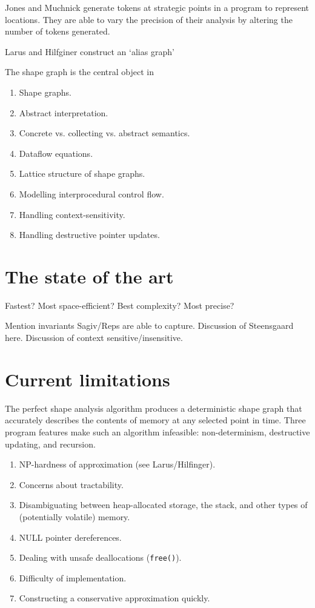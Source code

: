 \documentclass{article}
\begin{document}
    Jones and Muchnick generate tokens at strategic points in a program to
    represent locations. They are able to vary the precision of their
    analysis by altering the number of tokens generated. 

    Larus and Hilfginer construct an `alias graph'

The shape graph is the central object in 

\begin{enumerate}[1.]
    \item Shape graphs.
    \item Abstract interpretation.
    \item Concrete vs. collecting vs. abstract semantics.
    \item Dataflow equations.
    \item Lattice structure of shape graphs.
    \item Modelling interprocedural control flow.
    \item Handling context-sensitivity.
    \item Handling destructive pointer updates.
\end{enumerate}

\section{The state of the art}

Fastest?
Most space-efficient?
Best complexity?
Most precise?

Mention invariants Sagiv/Reps are able to capture.
Discussion of Steensgaard here.
Discussion of context sensitive/insensitive.

\section{Current limitations}

The perfect shape analysis algorithm produces a deterministic shape graph
that accurately describes the contents of memory at any selected point in
time. Three program features make such an algorithm infeasible:
non-determinism, destructive updating, and recursion. 

\begin{enumerate}[1.]
    \item NP-hardness of approximation (see Larus/Hilfinger).
    \item Concerns about tractability.
    \item Disambiguating between heap-allocated storage, the stack, and
        other types of (potentially volatile) memory.
    \item NULL pointer dereferences.
    \item Dealing with unsafe deallocations (\texttt{free()}).
    \item Difficulty of implementation.
    \item Constructing a conservative approximation quickly.
\end{enumerate}
\end{document}
